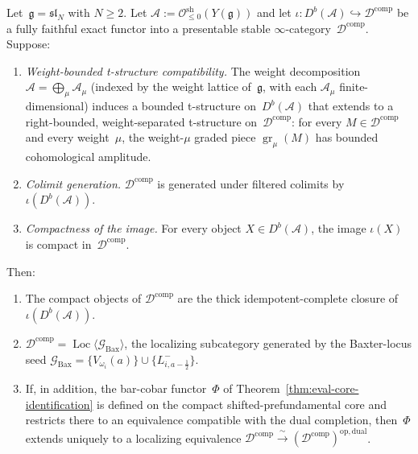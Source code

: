\begin{proposition}
\label{prop:completion-extension-weight-bounded}
Let~$\mathfrak{g} = \mathfrak{sl}_N$ with $N \geq 2$.
Let $\mathcal{A} := \mathcal{O}^{\mathrm{sh}}_{\leq 0}
(Y(\mathfrak{g}))$ and let
$\iota\colon D^b(\mathcal{A}) \hookrightarrow
\mathcal{D}^{\mathrm{comp}}$
be a fully faithful exact functor into a presentable stable
$\infty$-category~$\mathcal{D}^{\mathrm{comp}}$.
Suppose:
\begin{enumerate}[label=\textup{(\roman*)},nosep]
\item\label{it:weight-compatible}
 \emph{Weight-bounded t-structure compatibility.}
 The weight decomposition
 $\mathcal{A} = \bigoplus_{\mu} \mathcal{A}_\mu$
 \textup{(}indexed by the weight lattice of~$\mathfrak{g}$,
 with each $\mathcal{A}_\mu$ finite-dimensional\textup{)}
 induces a bounded t-structure on~$D^b(\mathcal{A})$ that
 extends to a right-bounded, weight-separated t-structure
 on~$\mathcal{D}^{\mathrm{comp}}$:
 for every $M \in \mathcal{D}^{\mathrm{comp}}$ and every
 weight~$\mu$, the weight-$\mu$ graded piece
 $\operatorname{gr}_\mu(M)$ has bounded cohomological
 amplitude.
\item\label{it:colimit-generation}
 \emph{Colimit generation.}
 $\mathcal{D}^{\mathrm{comp}}$ is generated under filtered
 colimits by~$\iota(D^b(\mathcal{A}))$.
\item\label{it:compactness-preservation}
 \emph{Compactness of the image.}
 For every object $X \in D^b(\mathcal{A})$, the image
 $\iota(X)$ is compact in~$\mathcal{D}^{\mathrm{comp}}$.
\end{enumerate}
Then:
\begin{enumerate}[label=\textup{(\alph*)},nosep]
\item The compact objects of $\mathcal{D}^{\mathrm{comp}}$ are the
 thick idempotent-complete closure of~$\iota(D^b(\mathcal{A}))$.
\item $\mathcal{D}^{\mathrm{comp}} =
 \operatorname{Loc}\langle \mathcal{G}_{\mathrm{Bax}} \rangle$,
 the localizing subcategory generated by the Baxter-locus seed
 $\mathcal{G}_{\mathrm{Bax}} =
 \{V_{\omega_i}(a)\} \cup \{L^-_{i,a-\frac{1}{2}}\}$.
\item If, in addition, the bar-cobar functor~$\Phi$ of
 Theorem~\textup{\ref{thm:eval-core-identification}} is defined on
 the compact shifted-prefundamental core and restricts there to an
 equivalence compatible with the dual completion, then~$\Phi$
 extends uniquely to a localizing equivalence
 $\mathcal{D}^{\mathrm{comp}} \xrightarrow{\;\sim\;}
 (\mathcal{D}^{\mathrm{comp}})^{\mathrm{op,dual}}$.
\end{enumerate}
\end{proposition}

